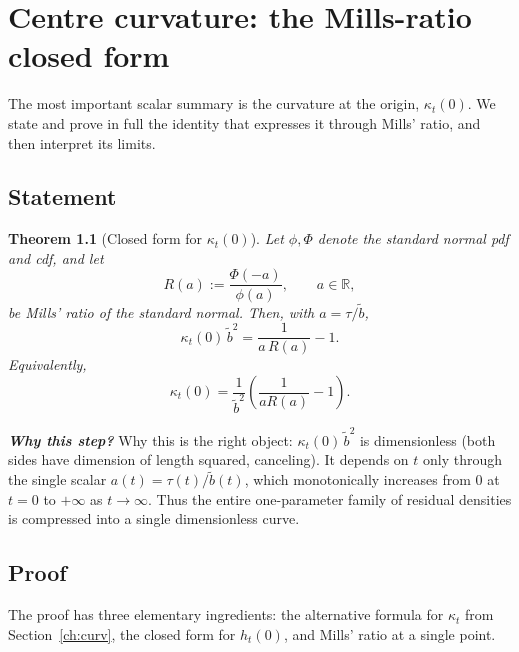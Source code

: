 \documentclass[11pt,a4paper,openany]{book}
\theoremstyle{plainserif}
\newtheorem{theorem}{Theorem}[chapter]
\theoremstyle{definition}
\theoremstyle{remarkstyle}
\newenvironment{whybox}{%
  \begin{center}\begin{minipage}{0.95\linewidth}\small
  \textbf{\textit{Why this step?}}\quad\ignorespaces}{%
  \end{minipage}\end{center}}
\newcommand{\R}{\mathbb{R}}
\newcommand{\btilde}{\tilde{b}}
\newcommand{\mills}{R}
\begin{document}
\chapter{Centre curvature: the Mills-ratio closed form}
\label{ch:mills}

The most important scalar summary is the curvature at the origin,
$\kappa_t(0)$. We state and prove in full the identity that expresses it
through Mills' ratio, and then interpret its limits.

\section{Statement}

\begin{theorem}[Closed form for $\kappa_t(0)$]
\label{thm:kappa-center}
Let $\phi, \Phi$ denote the standard normal pdf and cdf, and let
\begin{equation}
\mills(a) := \frac{\Phi(-a)}{\phi(a)}, \qquad a\in\R,
\label{eq:mills-def}
\end{equation}
be Mills' ratio of the standard normal. Then, with $a = \tau/\btilde$,
\begin{equation}
\boxed{\; \kappa_t(0)\,\btilde^2 = \frac{1}{a\,\mills(a)} - 1. \;}
\label{eq:mills-main}
\end{equation}
Equivalently,
\begin{equation}
\kappa_t(0) = \frac{1}{\btilde^2}\left(\frac{1}{a\mills(a)} - 1\right).
\end{equation}
\end{theorem}

\begin{whybox}
Why this is the right object: $\kappa_t(0)\,\btilde^2$ is dimensionless
(both sides have dimension of length squared, canceling). It depends on
$t$ only through the single scalar $a(t) = \tau(t)/\btilde(t)$, which
monotonically increases from $0$ at $t=0$ to $+\infty$ as $t\to\infty$.
Thus the entire one-parameter family of residual densities is compressed
into a single dimensionless curve.
\end{whybox}

\section{Proof}

The proof has three elementary ingredients: the alternative formula for
$\kappa_t$ from Section~\ref{ch:curv}, the closed form for $h_t(0)$, and
Mills' ratio at a single point.
\end{document}
